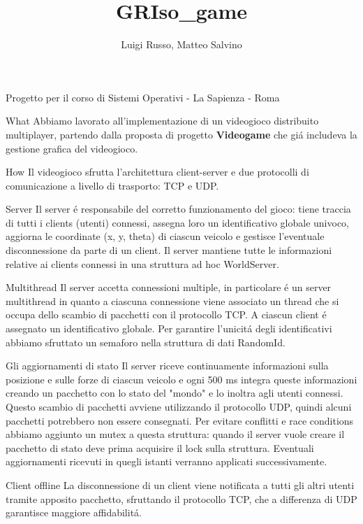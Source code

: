 \documentclass[12pt]{article}
\title{GRIso\_game}
\author{Luigi Russo, Matteo Salvino}
\begin{document}
\maketitle
Progetto per il corso di Sistemi Operativi - La Sapienza - Roma
\newpage

\begin{section}{What}
Abbiamo lavorato all'implementazione di un videogioco distribuito multiplayer, partendo dalla proposta di progetto \textbf{Videogame} che gi\'{a} includeva la gestione grafica del videogioco.
\end{section}


\begin{section}{How}
Il videogioco sfrutta l'architettura client-server e due protocolli di comunicazione a livello di trasporto: TCP e UDP.

\begin{subsection}{Server}
Il server \'{e} responsabile del corretto funzionamento del gioco: tiene traccia di tutti i clients (utenti) connessi, assegna loro un identificativo globale univoco, aggiorna le coordinate (x, y, theta) di ciascun veicolo e gestisce l'eventuale disconnessione da parte di un client. Il server mantiene tutte le informazioni relative ai clients connessi in una struttura ad hoc WorldServer.
\end{subsection} 
\begin{subsubsection}{Multithread}
Il server accetta connessioni multiple, in particolare \'{e} un server multithread in quanto a ciascuna connessione viene associato un thread che si occupa dello scambio di pacchetti con il protocollo TCP.
\newline\newline
A ciascun client \'{e} assegnato un identificativo globale. Per garantire l'unicit\'{a} degli identificativi abbiamo sfruttato un semaforo nella struttura di dati RandomId.
\end{subsubsection}
\begin{subsubsection}{Gli aggiornamenti di stato}
Il server riceve continuamente informazioni sulla posizione e sulle forze di ciascun veicolo e ogni 500 ms integra queste informazioni creando un pacchetto con lo stato del "mondo" e lo inoltra agli utenti connessi. Questo scambio di pacchetti avviene utilizzando il protocollo UDP, quindi alcuni pacchetti potrebbero non essere consegnati.
\newline\newline
Per evitare conflitti e race conditions abbiamo aggiunto un mutex a questa struttura: quando il server vuole creare il pacchetto di stato deve prima acquisire il lock sulla struttura. Eventuali aggiornamenti ricevuti in quegli istanti verranno applicati successivamente.
\end{subsubsection}
\begin{subsubsection}{Client offline}
La disconnessione di un client viene notificata a tutti gli altri utenti tramite apposito pacchetto, sfruttando il protocollo TCP, che a differenza di UDP garantisce maggiore affidabilit\'{a}.
\end{subsubsection}



\end{section}
\end{document}
